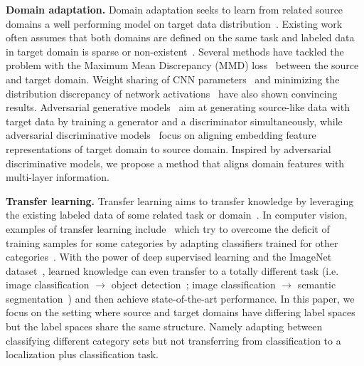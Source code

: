 \textbf{Domain adaptation.}
Domain adaptation seeks to learn from related source domains a well performing model on target data distribution~\cite{csurka2017domain}. Existing work often assumes that both domains are defined on the same task and labeled data in target domain is sparse or non-existent~\cite{tzeng2017adversarial}. 
Several methods have tackled the problem with the Maximum Mean Discrepancy (MMD) loss~\cite{gretton2009covariate,long2015learning,long2016deep,long2016unsupervised,zhang2015deep} between the source and target domain. Weight sharing of CNN parameters~\cite{sun2016deep,hoffman2016cross,hoffman2016learning,castrejon2016learning} and minimizing the distribution discrepancy of network activations~\cite{rozantsev2016beyond,tzeng2014deep,li2016revisiting} have also shown convincing results. Adversarial generative models~\cite{liu2016coupled,liu2017unsupervised,bousmalis2016unsupervised,taigman2016unsupervised} aim at generating source-like data with target data by training a generator and a discriminator simultaneously, while adversarial discriminative models~\cite{tzeng2015simultaneous,tzeng2017adversarial,ganin2016domain,ganin2014unsupervised,hoffman2016fcns} focus on aligning embedding feature representations of target domain to source domain. Inspired by adversarial discriminative models, we propose a method that aligns domain features with multi-layer information.


\textbf{Transfer learning.}
Transfer learning aims to transfer
knowledge by leveraging the existing labeled data of some related task or domain~\cite{pan2010survey,weiss2016survey}. In computer vision, examples of transfer learning include~\cite{aytar2011tabula,lim2011transfer,tommasi2010safety} which try to overcome the deficit of training samples for some categories by adapting classifiers trained for other categories~\cite{oquab2014learning}. With the power of deep supervised learning and the ImageNet dataset~\cite{imagenet_cvpr09, russakovsky2015imagenet}, learned knowledge can even transfer to a totally different task (i.e. image classification $\rightarrow$ object detection~\cite{ren2015faster,redmon2016you,liu2016ssd}; image classification $\rightarrow$ semantic segmentation~\cite{long2015fully}) and then achieve state-of-the-art performance. In this paper, we focus on the setting where source and target domains have differing label spaces but the label spaces share the same structure. Namely adapting between classifying different category sets but not transferring from classification to a localization plus classification task.

